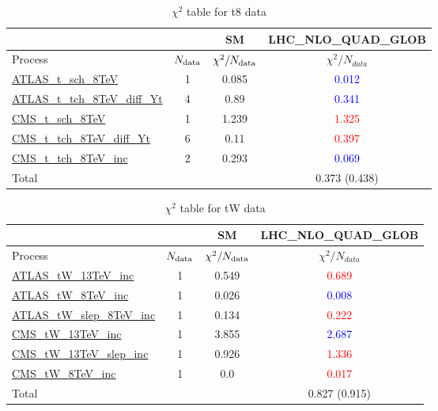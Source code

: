 \documentclass{article}
\begin{document}
\begin{table}[H]
\centering
\begin{tabular}{|l|c|c|c|}
\hline
 \multicolumn{2}{|c|}{} & SM& LHC_NLO_QUAD_GLOB\\ \hline
Process & $N_{\rm data}$ & $\chi^ 2/N_{\rm data}$& $\chi^ 2/N_{data}$\\ \hline
\href{https://arxiv.org}{ATLAS_t_sch_8TeV} & 1 & 0.085 & \textcolor{blue}                            {0.012} \\ \hline
\href{https://arxiv.org}{ATLAS_t_tch_8TeV_diff_Yt} & 4 & 0.89 & \textcolor{blue}                            {0.341} \\ \hline
\href{https://arxiv.org}{CMS_t_sch_8TeV} & 1 & 1.239 & \textcolor{red}                            {1.325} \\ \hline
\href{https://arxiv.org}{CMS_t_tch_8TeV_diff_Yt} & 6 & 0.11 & \textcolor{red}                            {0.397} \\ \hline
\href{https://arxiv.org}{CMS_t_tch_8TeV_inc} & 2 & 0.293 & \textcolor{blue}                            {0.069} \\ \hline
\hline Total & &  & 0.373 (0.438) \\ \hline
\end{tabular}
\caption{$\chi^2$ table for t8 data}
\end{table}
\begin{table}[H]
\centering
\begin{tabular}{|l|c|c|c|}
\hline
 \multicolumn{2}{|c|}{} & SM& LHC_NLO_QUAD_GLOB\\ \hline
Process & $N_{\rm data}$ & $\chi^ 2/N_{\rm data}$& $\chi^ 2/N_{data}$\\ \hline
\href{https://arxiv.org}{ATLAS_tW_13TeV_inc} & 1 & 0.549 & \textcolor{red}                            {0.689} \\ \hline
\href{https://arxiv.org}{ATLAS_tW_8TeV_inc} & 1 & 0.026 & \textcolor{blue}                            {0.008} \\ \hline
\href{https://arxiv.org}{ATLAS_tW_slep_8TeV_inc} & 1 & 0.134 & \textcolor{red}                            {0.222} \\ \hline
\href{https://arxiv.org}{CMS_tW_13TeV_inc} & 1 & 3.855 & \textcolor{blue}                            {2.687} \\ \hline
\href{https://arxiv.org}{CMS_tW_13TeV_slep_inc} & 1 & 0.926 & \textcolor{red}                            {1.336} \\ \hline
\href{https://arxiv.org}{CMS_tW_8TeV_inc} & 1 & 0.0 & \textcolor{red}                            {0.017} \\ \hline
\hline Total & &  & 0.827 (0.915) \\ \hline
\end{tabular}
\caption{$\chi^2$ table for tW data}
\end{table}
\end{document}
